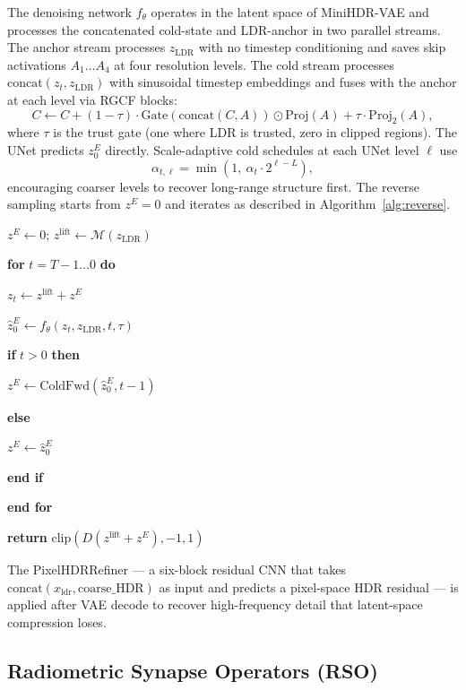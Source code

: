 \documentclass[10pt,twocolumn,letterpaper]{article}
\makeatletter
\newcounter{alg@ln}
\newlength{\alg@ind}
\newenvironment{algorithmic}[1][0]{%
  \setcounter{alg@ln}{0}\setlength{\alg@ind}{0pt}%
  \par\footnotesize\ttfamily
  \begin{list}{}{%
    \setlength{\leftmargin}{1.8em}\setlength{\labelwidth}{1.2em}%
    \setlength{\labelsep}{0.4em}\setlength{\topsep}{2pt}%
    \setlength{\itemsep}{0pt}\setlength{\parsep}{0pt}}%
}{%
  \end{list}\par
}
\newcommand{\alg@item}{\item[\stepcounter{alg@ln}{\scriptsize\arabic{alg@ln}:}]\hspace*{\alg@ind}}
\newcommand{\STATE}{\alg@item}
\newcommand{\FOR}[1]{\alg@item\textbf{for} #1 \textbf{do}\addtolength{\alg@ind}{1.2em}}
\newcommand{\ENDFOR}{\addtolength{\alg@ind}{-1.2em}\alg@item\textbf{end for}}
\newcommand{\IF}[1]{\alg@item\textbf{if} #1 \textbf{then}\addtolength{\alg@ind}{1.2em}}
\newcommand{\ELSE}{\addtolength{\alg@ind}{-1.2em}\alg@item\textbf{else}\addtolength{\alg@ind}{1.2em}}
\newcommand{\ENDIF}{\addtolength{\alg@ind}{-1.2em}\alg@item\textbf{end if}}
\newcommand{\zlift}{z^{\mathrm{lift}}}
\newcommand{\xldr}{x_{\mathrm{ldr}}}
\makeatother
\begin{document}
The denoising network $f_\theta$ operates in the latent space of MiniHDR-VAE and processes the concatenated cold-state and LDR-anchor in two parallel streams. The anchor stream processes $z_{\mathrm{LDR}}$ with no timestep conditioning and saves skip activations $A_1 \ldots A_4$ at four resolution levels. The cold stream processes $\mathrm{concat}(z_t, z_{\mathrm{LDR}})$ with sinusoidal timestep embeddings and fuses with the anchor at each level via RGCF blocks:
\begin{equation}
C \leftarrow C + (1-\tau)\cdot \mathrm{Gate}(\mathrm{concat}(C,A)) \odot \mathrm{Proj}(A) + \tau \cdot \mathrm{Proj}_2(A),
\label{eq:rgcf}
\end{equation}
where $\tau$ is the trust gate (one where LDR is trusted, zero in clipped regions). The UNet predicts $z_0^E$ directly. Scale-adaptive cold schedules at each UNet level $\ell$ use
\begin{equation}
\alpha_{t,\ell} = \min\!\left(1,\ \alpha_t \cdot 2^{\ell-L}\right),
\label{eq:scale-adaptive}
\end{equation}
encouraging coarser levels to recover long-range structure first. The reverse sampling starts from $z^E=0$ and iterates as described in Algorithm~\ref{alg:reverse}.

\begin{algorithm}[t]
\caption{Reverse Cold Sampling (\texttt{restore\_hdr})}
\label{alg:reverse}
\begin{algorithmic}[1]
\STATE $z^E \leftarrow 0$; $\zlift \leftarrow \mathcal{M}(z_{\mathrm{LDR}})$
\FOR{$t = T-1 \ldots 0$}
  \STATE $z_t \leftarrow \zlift + z^E$
  \STATE $\hat z_0^E \leftarrow f_\theta(z_t, z_{\mathrm{LDR}}, t, \tau)$
  \IF{$t > 0$}
    \STATE $z^E \leftarrow \mathrm{ColdFwd}(\hat z_0^E, t-1)$
  \ELSE
    \STATE $z^E \leftarrow \hat z_0^E$
  \ENDIF
\ENDFOR
\STATE \textbf{return} $\mathrm{clip}(D(\zlift + z^E), -1, 1)$
\end{algorithmic}
\end{algorithm}

The PixelHDRRefiner --- a six-block residual CNN that takes $\mathrm{concat}(\xldr, \mathrm{coarse\_HDR})$ as input and predicts a pixel-space HDR residual --- is applied after VAE decode to recover high-frequency detail that latent-space compression loses.

\subsection{Radiometric Synapse Operators (RSO)}
\end{document}

